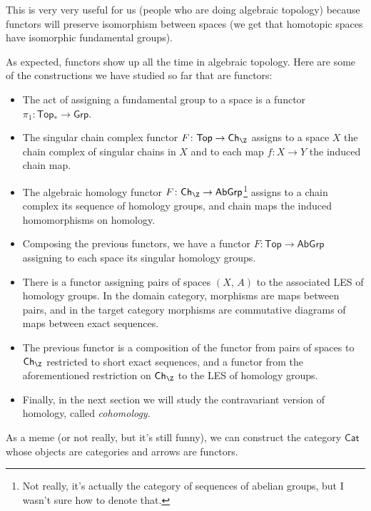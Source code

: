 This is very very useful for us (people who are doing algebraic topology) because functors will preserve isomorphism between spaces (we get that homotopic spaces have isomorphic fundamental groups).
\begin{example}
   As expected, functors show up all the time in algebraic topology. Here are some of the constructions we have studied so far that are functors:
   \begin{itemize}
       \item The act of assigning a fundamental group to a space is a functor $\pi_1 \colon \mathsf{Top_*}  \to \mathsf{Grp} $.
       \item The singular chain complex functor $F \colon \mathsf{Top}  \to \mathsf{Ch} _{\Z}$ assigns to a space $X$ the chain complex of singular chains in $X$ and to each map $f\colon X \to Y$ the induced chain map. 
       \item The algebraic homology functor $F \colon \mathsf{Ch}_{\Z} \to \mathsf{AbGrp}  $\footnote{Not really, it's actually the category of sequences of abelian groups, but I wasn't sure how to denote that.} assigns to a chain complex its sequence of homology groups, and chain maps the induced homomorphisms on homology.
        \item Composing the previous functors, we have a functor $F \colon \mathsf{Top}  \to \mathsf{AbGrp} $ assigning to each space its singular homology groups.
        \item There is a functor assigning pairs of spaces $(X,\,A)$ to the associated LES of homology groups. In the domain category, morphisms are maps between pairs, and in the target category morphisms are commutative diagrams of maps between exact sequences. 
        \item The previous functor is a composition of the functor from pairs of spaces to $\mathsf{Ch} _{\Z}$ restricted to short exact sequences, and a functor from the aforementioned restriction on $\mathsf{Ch} _{\Z}$ to the LES of homology groups.
        \item Finally, in the next section we will study the contravariant version of homology, called \emph{cohomology}.
   \end{itemize}
\end{example}
\begin{note}
    As a meme (or not really, but it's still funny), we can construct the category $\mathsf{Cat}$ whose objects are categories and arrows are functors.
\end{note}

